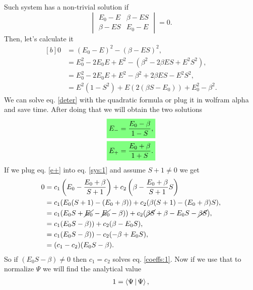 \begin{questions}
\begin{solution}
Such system has a non-trivial solution if
\begin{equation}
  \begin{vmatrix}
    E_0 - E & \beta - ES \\
    \beta - ES & E_0 - E
  \end{vmatrix} = 0.
  \label{det}
\end{equation}
Then, let's calculate it
\begin{equation}
  \begin{aligned}[b]
  0 &= (E_0 - E)^2 - (\beta-ES)^2,\\
    &=E_0^2 - 2E_0E + E^2 - (\beta^2 - 2\beta ES + E^2S^2),\\
    &=E_0^2 - 2E_0E + E^2 - \beta^2 + 2\beta ES - E^2S^2, \\
    &=E^2(1-S^2) + E(2(\beta S - E_0)) + E_0^2 - \beta^2.
  \end{aligned}
  \label{deter}
\end{equation}
We can solve eq. \ref{deter} with the quadratic formula or plug it in wolfram alpha and save time. After doing that we will obtain the two solutions
\begin{eqnarray}
  \hlgreen{E_- = \frac{E_0-\beta}{1-S},} \label{e-}\\
  \hlgreen{E_+ = \frac{E_0+\beta}{1+S}.} \label{e+}
\end{eqnarray}
If we plug eq. \ref{e+} into eq. \ref{sys:1} and assume $S+1 \neq 0$ we get
\begin{equation}
  \begin{aligned}[b]
    0 &= c_1\left(E_0 - \frac{E_0+\beta}{S+1}\right) + c_2\left(\beta - \frac{E_0+\beta}{S+1}S\right) \\
    &=c_1(E_0(S+1) - (E_0+\beta)) + c_2(\beta(S+1) - (E_0+\beta)S),\\
    &=c_1(E_0S+\cancel{E_0} - \cancel{E_0}-\beta)) + c_2(\cancel{\beta S}+\beta - E_0S-\cancel{\beta S}),\\
    &=c_1(E_0S-\beta)) + c_2(\beta - E_0S), \\
    &=c_1(E_0S-\beta)) - c_2(-\beta + E_0S), \\
    &= (c_1 - c_2)(E_0S-\beta).
    \label{coeffs:1}
  \end{aligned}
\end{equation}
So if $(E_0S-\beta)\neq 0 $ then $c_1 = c_2$ solves eq. \ref{coeffs:1}.
Now if we use that to normalize $\Psi$ we will find the analytical value
\begin{equation}
  \begin{aligned}[b]
    1 &= \Braket{\Psi|\Psi},\\

\end{aligned}
\end{equation}
\end{solution}
\end{questions}
